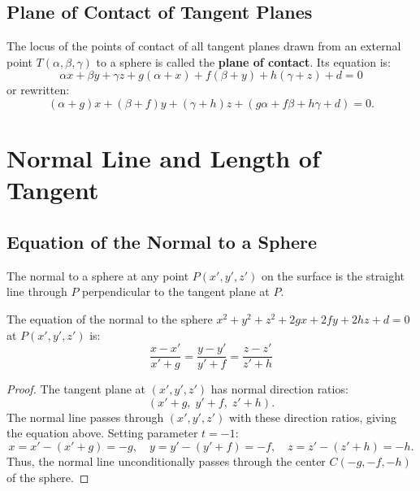 \subsection{Plane of Contact of Tangent Planes}
\begin{conceptbox}
The locus of the points of contact of all tangent planes drawn from an external point $T(\alpha, \beta, \gamma)$ to a sphere is called the \textbf{plane of contact}.
Its equation is:
\begin{equation}
    \boxed{\alpha x + \beta y + \gamma z + g(\alpha + x) + f(\beta + y) + h(\gamma + z) + d = 0}
\end{equation}
or rewritten:
\begin{equation}
    (\alpha + g)x + (\beta + f)y + (\gamma + h)z + (g\alpha + f\beta + h\gamma + d) = 0.
\end{equation}
\end{conceptbox}

\section{Normal Line and Length of Tangent}

\subsection{Equation of the Normal to a Sphere}
The normal to a sphere at any point $P(x', y', z')$ on the surface is the straight line through $P$ perpendicular to the tangent plane at $P$.

\begin{theorembox}
The equation of the normal to the sphere $x^2 + y^2 + z^2 + 2gx + 2fy + 2hz + d = 0$ at $P(x', y', z')$ is:
\begin{equation}
    \boxed{\frac{x - x'}{x' + g} = \frac{y - y'}{y' + f} = \frac{z - z'}{z' + h}}
\end{equation}
\end{theorembox}

\begin{proof}
The tangent plane at $(x', y', z')$ has normal direction ratios:
\begin{equation}
    (x' + g, \; y' + f, \; z' + h).
\end{equation}
The normal line passes through $(x', y', z')$ with these direction ratios, giving the equation above.
Setting parameter $t = -1$:
\begin{equation}
    x = x' - (x' + g) = -g, \quad y = y' - (y' + f) = -f, \quad z = z' - (z' + h) = -h.
\end{equation}
Thus, the normal line unconditionally passes through the center $C(-g, -f, -h)$ of the sphere.
\end{proof}

